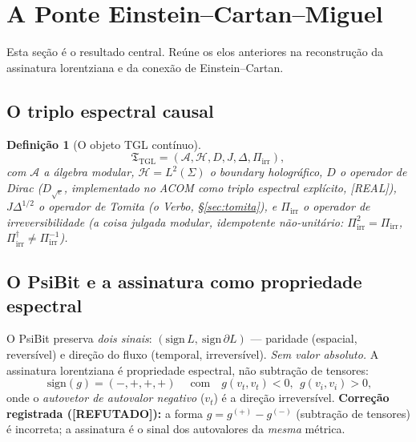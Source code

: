 \documentclass[11pt,a4paper]{article}
\newcommand{\REAL}{\textsf{[REAL]}}
\newcommand{\REF}{\textsf{[REFUTADO]}}
\newcommand{\Hil}{\mathcal H}
\newcommand{\Alg}{\mathcal A}
\newtheorem{definition}{Definição}
\begin{document}
\section{A Ponte Einstein--Cartan--Miguel}\label{sec:ponte}
Esta seção é o resultado central. Reúne os elos anteriores na reconstrução
da assinatura lorentziana e da conexão de Einstein--Cartan.

\subsection{O triplo espectral causal}
\begin{definition}[O objeto TGL contínuo]
\begin{equation}
\mathfrak T_{\mathrm{TGL}}=
(\Alg,\Hil,D,J,\Delta,\Pi_{\mathrm{irr}}),
\end{equation}
com $\Alg$ a álgebra modular, $\Hil=L^2(\Sigma)$ o boundary holográfico, $D$
o operador de Dirac ($D_{\sqrt e}$, implementado no ACOM como triplo espectral
explícito, \REAL), $J\Delta^{1/2}$ o operador de Tomita (o Verbo,
\S\ref{sec:tomita}), e $\Pi_{\mathrm{irr}}$ o operador de irreversibilidade
(a coisa julgada modular, idempotente não-unitário:
$\Pi_{\mathrm{irr}}^2=\Pi_{\mathrm{irr}}$, $\Pi_{\mathrm{irr}}^\dagger\neq
\Pi_{\mathrm{irr}}^{-1}$).
\end{definition}

\subsection{O PsiBit e a assinatura como propriedade espectral}
O PsiBit preserva \emph{dois sinais}: $(\mathrm{sign}\,L,\ \mathrm{sign}\,
\partial L)$ --- paridade (espacial, reversível) e direção do fluxo (temporal,
irreversível). \emph{Sem valor absoluto.} A assinatura lorentziana é
propriedade espectral, não subtração de tensores:
\begin{equation}
\boxed{\;\mathrm{sign}(g)=(-,+,+,+)\;}\quad\text{com}\quad
g(v_t,v_t)<0,\ \ g(v_i,v_i)>0,
\end{equation}
onde o \emph{autovetor de autovalor negativo} ($v_t$) é a direção
irreversível. \textbf{Correção registrada (\REF):} a forma $g=g^{(+)}-g^{(-)}$
(subtração de tensores) é incorreta; a assinatura é o sinal dos autovalores
da \emph{mesma} métrica.
\end{document}
